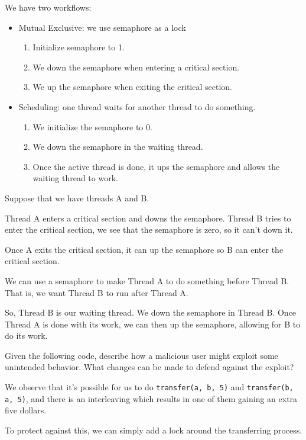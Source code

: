 \documentclass[openany]{book}
\begin{document}
We have two workflows:
\begin{itemize}
	\item Mutual Exclusive: we use semaphore as a lock
	\begin{enumerate}
		\item Initialize semaphore to 1.
		\item We down the semaphore when entering a critical section.
		\item We up the semaphore when exiting the critical section.
	\end{enumerate}
	\item Scheduling: one thread waits for another thread to do something.
	\begin{enumerate}
		\item We initialize the semaphore to 0.
		\item We down the semaphore in the waiting thread.
		\item Once the active thread is done, it ups the semaphore and allows the waiting thread to work.
	\end{enumerate}
	
\end{itemize}

\begin{example}
	Suppose that we have threads A and B.
	
	Thread A enters a critical section and downs the semaphore. Thread B tries to enter the critical section, we see that the semaphore is zero, so it can't down it.
	
	Once A exits the critical section, it can up the semaphore so B can enter the critical section.
\end{example}

\begin{example}
	We can use a semaphore to make Thread A to do something before Thread B. That is, we want Thread B to run after Thread A.
	
	So, Thread B is our waiting thread. We down the semaphore in Thread B. Once Thread A is done with its work, we can then up the semaphore, allowing for B to do its work.
\end{example}

\begin{hw}
	Given the following code, describe how a malicious user might exploit some unintended behavior. What changes can be made to defend against the exploit?
\end{hw}
\begin{solution}
	We observe that it's possible for us to do \texttt{transfer(a, b, 5)} and \texttt{transfer(b, a, 5)}, and there is an interleaving which results in one of them gaining an extra five dollars.
	
	To protect against this, we can simply add a lock around the transferring process.
\end{solution}
\end{document}
